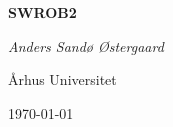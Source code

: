 \begin{titlepage}
	\centering
	\vspace*{6cm}
	{\Huge\bfseries SWROB2\par}
	\vspace{2cm}
	{\Large\itshape Anders Sandø Østergaard\par}
	Århus Universitet \par
	\vfill
	\today
\end{titlepage}
\thispagestyle{empty}
\tableofcontents
\clearpage